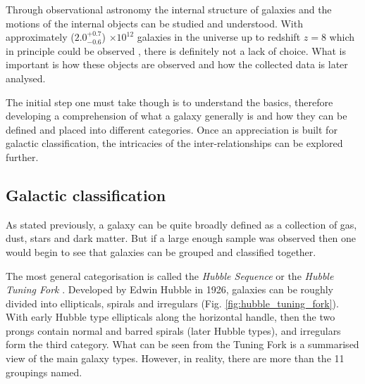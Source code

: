 \documentclass[12pt, twocolumn]{revtex4}    %
\begin{document}
Through observational astronomy the internal structure of galaxies and the motions of the internal objects can be studied and understood. With approximately ($2.0^{+0.7}_{-0.6}$) $\times 10^{12}$ galaxies in the universe up to redshift $z=8$ which in principle could be observed \citep{conselice_galaxynumber}, there is definitely not a lack of choice. What is important is how these objects are observed and how the collected data is later analysed. 




The initial step one must take though is to understand the basics, therefore developing a comprehension of what a galaxy generally is and how they can be defined and placed into different categories. Once an appreciation is built for galactic classification, the intricacies of the inter-relationships can be explored further. 


\subsection{Galactic classification}

As stated previously, a galaxy can be quite broadly defined as a collection of gas, dust, stars and dark matter. But if a large enough sample was observed then one would begin to see that galaxies can be grouped and classified together.

The most general categorisation is called the \textit{Hubble Sequence} or the \textit{Hubble Tuning Fork} \citep{carroll_astro}. Developed by Edwin Hubble in 1926, galaxies can be roughly divided into ellipticals, spirals and irregulars (Fig. \ref{fig:hubble_tuning_fork}). With early Hubble type ellipticals along the horizontal handle, then the two prongs contain normal and barred spirals (later Hubble types), and irregulars form the third category. What can be seen from the Tuning Fork is a summarised view of the main galaxy types. However, in reality, there are more than the 11 groupings named.
\end{document}
